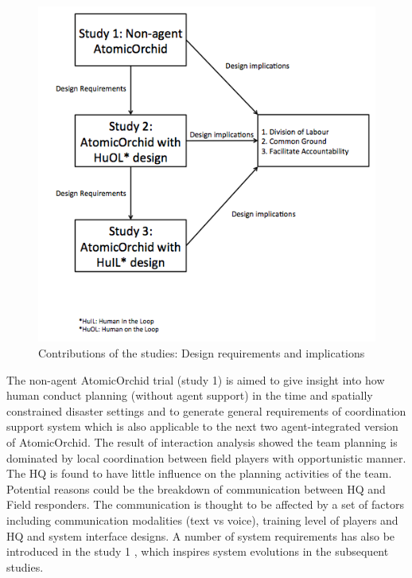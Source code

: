 \begin{figure}[h]
  \centering
  \includegraphics[width=1\textwidth]{img/conclusion/connections}
  \caption{ Contributions of the studies: Design requirements and implications}
  \label{fig:connections}
\end{figure}

The non-agent AtomicOrchid trial (study 1) is aimed to give insight into how human conduct planning (without agent support) in the time and spatially constrained disaster settings and to generate general requirements of coordination support system which is also applicable to the next two agent-integrated version of AtomicOrchid. The result of interaction analysis showed the team planning is dominated by local coordination between field players with opportunistic manner. The HQ is found to have little influence on the planning activities of the team. Potential reasons could be the breakdown of communication between HQ and Field responders. The communication is thought to be affected by a set of factors including communication modalities (text vs voice), training level of players and HQ and system interface designs. A number of system requirements has also be introduced in the study 1 , which inspires system evolutions in the subsequent studies. \\


